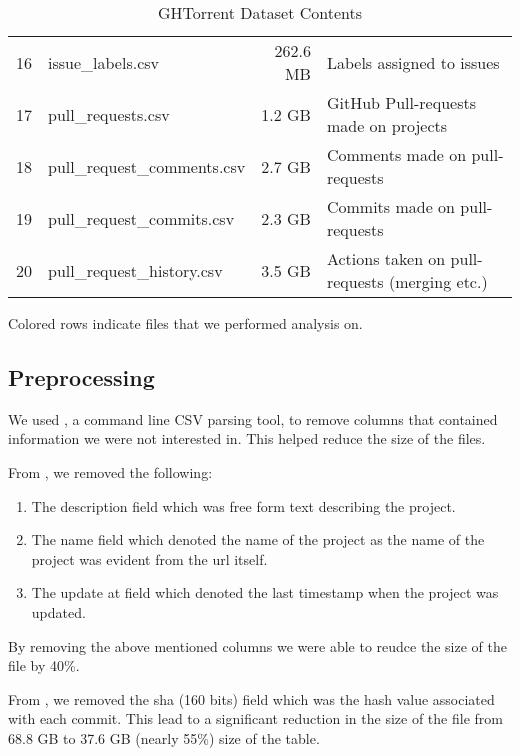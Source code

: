 \begin{table}[htb]
\begin{tabular}{@{}llrl@{}}
           16 & issue\_labels.csv           & 262.6 MB & Labels assigned to issues \\
           \rowcolor{LightCyan}
           17 & pull\_requests.csv          & 1.2 GB   & GitHub Pull-requests made on projects \\
           18 & pull\_request\_comments.csv & 2.7 GB   & Comments made on pull-requests \\
           19 & pull\_request\_commits.csv  & 2.3 GB   & Commits made on pull-requests \\
           20 & pull\_request\_history.csv  & 3.5 GB   & Actions taken on pull-requests (merging etc.) \\

        \bottomrule
    \end{tabular}

    \caption{GHTorrent Dataset Contents}
    \small{Colored rows indicate files that we performed analysis on.}
\end{table}

\newpage
\subsection{Preprocessing}

We used , a command line CSV parsing tool, to remove columns that contained information we were not interested in. This helped reduce the size of the files. \\ \linebreak

From , we removed the following:
\begin{enumerate}
    \item The description field which was free form text describing the project.
    \item The name field which denoted the name of the project as the name of the project was evident from the url itself.
    \item The update at field which denoted the last timestamp when the project was updated.
\end{enumerate}
By removing the above mentioned columns we were able to reudce the size of the file by 40\%. \linebreak


From , we removed the sha (160 bits) field which was the hash value associated with each commit. This lead to a significant reduction in the size of the file from 68.8 GB to 37.6 GB (nearly 55\%) size of the table. \\



